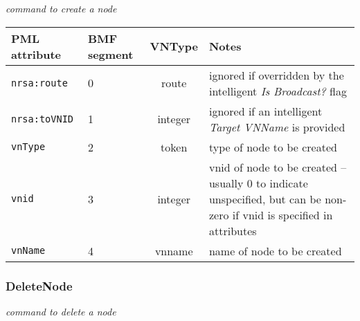 \documentclass[pdftex,a4paper]{article}
\newcommand{\XMLfont}[1]{{\tt \small #1}}
\begin{document}
{\em command to create a node}

\begin{table}[!h]
  \begin{center}
    \label{tab:CreateNode}
    \begin{tabular}{|l|p{13mm}|c|p{60mm}|}
      \hline

      \textbf{PML attribute} & \textbf{BMF segment} & \textbf{VNType}
      & \textbf{Notes} \\\hline

      \XMLfont{nrsa:route} & 0 & route & ignored if overridden by the
      intelligent {\em Is Broadcast?} flag \\\hline

      \XMLfont{nrsa:toVNID} & 1 & integer & ignored if an intelligent {\em
      Target VNName} is provided \\\hline

      \XMLfont{vnType} & 2 & token & type of node to be created
      \\\hline

      \XMLfont{vnid} & 3 & integer & vnid of node to be created
      -- usually 0 to indicate unspecified, but can be
      non-zero if vnid is specified in attributes\\\hline

      \XMLfont{vnName} & 4 & vnname & name of node to be created
      \\\hline

    \end{tabular}
  \end{center}
\end{table}

\subsubsection{DeleteNode}

{\em command to delete a node}
\end{document}
